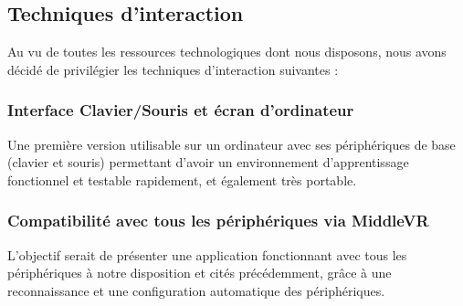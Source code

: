\subsection{Techniques d'interaction}
Au vu de toutes les ressources technologiques dont nous disposons, nous avons décidé de privilégier les techniques d'interaction suivantes :

\subsubsection{Interface Clavier/Souris et écran d'ordinateur}
Une première version utilisable sur un ordinateur avec ses périphériques de base (clavier et souris) permettant d'avoir un environnement d'apprentissage fonctionnel et testable rapidement, et également très portable.

\subsubsection{Compatibilité avec tous les périphériques via MiddleVR}
L'objectif serait de présenter une application fonctionnant avec tous les périphériques à notre disposition et cités précédemment, grâce à une reconnaissance et une configuration automatique des périphériques.
\\

